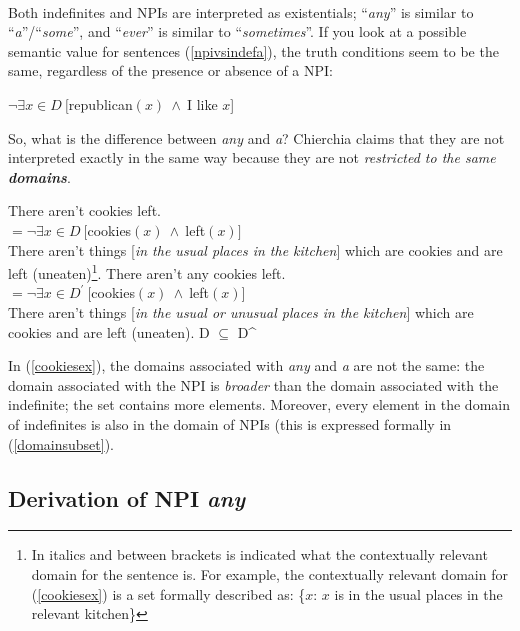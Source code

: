 \documentclass[a4paper,11pt]{article}
\newcommand{\reff}[1]{(\ref{#1})}
\newcommand{\exs}[2][]{\begin{exe}\ex #1 \begin{xlist}#2\end{xlist}\end{exe}}
\begin{document}
\paragraph{}
Both indefinites and NPIs are interpreted as existentials; \enquote{\emph{any}} is similar to \enquote{\emph{a}}/\enquote{\emph{some}}, and \enquote{\emph{ever}} is similar to \enquote{\emph{sometimes}}. If you look at a possible semantic value for sentences \reff{npivsindefa}, the truth conditions seem to be the same, regardless of the presence or absence of a NPI:

\begin{exe}
   $\neg \exists{x \in D}~[$republican$(x)~\wedge~$I like $x$]
\end{exe}

So, what is the difference between \emph{any} and \emph{a}? Chierchia claims that they are not interpreted exactly in the same way because they are not \emph{restricted to the same \textbf{domains}}.

\exs[\label{cookiesex}]{
  \ex There aren't cookies\rb{} left.\\
                       $= \neg \exists{x \in D}~[$cookies$(x)~\wedge~$left$(x)]$\\
                       There aren't things [\emph{in the usual places in the kitchen}] which are cookies and are left (uneaten)\footnote{In italics and between brackets is indicated what the contextually relevant domain for the sentence is. For example, the contextually relevant domain for \reff{cookiesex} is a set formally described as: \{$x$: $x$ is in the usual places in the relevant kitchen\}}.
  \ex There aren't \lb{DP,~D^{\prime}}any cookies\rb{} left.\\
      $= \neg \exists{x \in D^{\prime}}~[$cookies$(x)~\wedge~$left$(x)]$\\
      There aren't things [\emph{in the usual or unusual places in the kitchen}] which are cookies and are left (uneaten).
  \ex\label{domainsubset} D $\subseteq$ D^{\prime}
}
%
In \reff{cookiesex}, the domains associated with \emph{any} and \emph{a} are not the same: the domain associated with the NPI is \emph{broader} than the domain associated with the indefinite; the set contains more elements. Moreover, every element in the domain of indefinites is also in the domain of NPIs (this is expressed formally in \reff{domainsubset}.


\subsection{Derivation of NPI \textit{any}}
\end{document}
